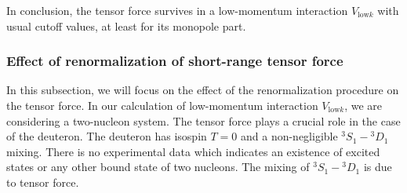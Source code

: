 \documentclass[a4paper]{jpconf}
\newcommand\Vlowk{V_{\mathrm{low}k}}
\begin{document}
 In conclusion, the tensor force survives in a low-momentum interaction
 $\Vlowk$ with usual cutoff values,
 at least for its  monopole part. 
 
   \subsubsection{Effect of renormalization of short-range tensor force}
   
    In this subsection, we will focus on the effect of the renormalization procedure on the
    tensor force.
    In our calculation of low-momentum interaction $\Vlowk$, we are
    considering a two-nucleon system.
    The tensor force plays a crucial role in the case of the deuteron.
    The deuteron has isospin $T=0$ and a non-negligible ${}^3S_1-{}^3D_1$ mixing. There is no experimental 
data which indicates an existence
    of excited states or any other bound state of two nucleons.
    The mixing of ${}^3S_1-{}^3D_1$ is due to tensor force.
    
\end{document}
